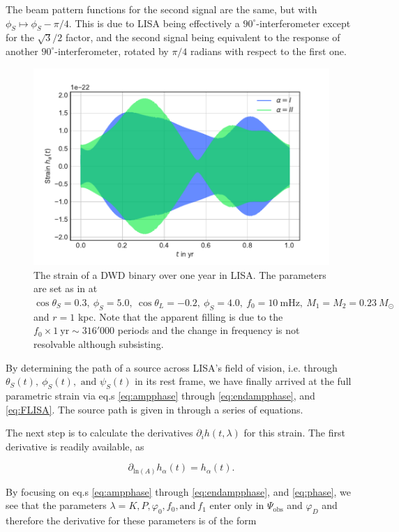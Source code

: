\documentclass{aa}
\begin{document}
The beam pattern functions for the second signal are the same, but with $\phi_S \mapsto \phi_S - \pi/4$. This is due to LISA being effectively a $90^\circ$-interferometer except for the $\sqrt{3}/2$ factor, and the second signal being equivalent to the response of another $90^\circ$-interferometer, rotated by $\pi/4$ radians with respect to the first one.

\begin{figure}
    \centering
    \includegraphics[width=.5\textwidth]{Strain.pdf}
\caption{The strain of a DWD binary over one year in LISA. The parameters are set as in \citep{cutler} at $\cos \theta_S = 0.3,\ \phi_S=5.0,\ \cos \theta_L = -0.2,\ \phi_S=4.0,\ f_0 =10\ \mathrm{mHz},\  M_1=M_2=0.23\ M_\odot$ and $r=1$ kpc. Note that the apparent filling is due to the $f_0 \times 1\ \mathrm{yr}\sim 316'000$ periods and the change in frequency is not resolvable although subsisting.}
    \label{fig:geometry}
\end{figure}

By determining the path of a source across LISA's field of vision, i.e. through $\theta_S(t),\ \phi_S(t),\text{ and }\psi_S(t)$ in its rest frame, we have finally arrived at the full parametric strain via eq.s \ref{eq:ampphase} through \ref{eq:endampphase}, and \ref{eq:FLISA}. The source path is given in \citep{cutler} through a series of equations.

The next step is to calculate the derivatives $\partial_i h(t,\lambda)$ for this strain. The first derivative is readily available, as

\begin{equation}
    \partial_{\mathrm{ln}(A)} h_\alpha(t) = h_\alpha(t).
\end{equation}

By focusing on eq.s \ref{eq:ampphase} through \ref{eq:endampphase}, and \ref{eq:phase}, we see that the parameters $\lambda=K,P,\varphi_0,f_0,\mathrm{ and }\ f_1$ enter only in $\Psi_\mathrm{obs}$ and $\varphi_D$ and therefore the derivative for these parameters is of the form
\end{document}
